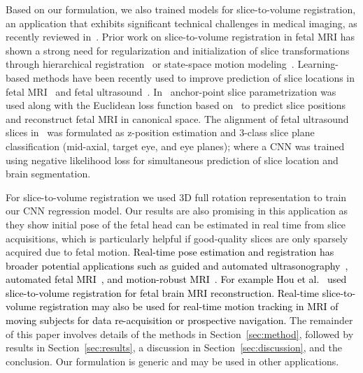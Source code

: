 \documentclass[journal,transmag]{IEEEtran}
\begin{document}
Based on our formulation, we also trained models for slice-to-volume registration, an application that exhibits significant technical challenges in medical imaging, as recently reviewed in~\cite{ferrante2017slice}. Prior work on slice-to-volume registration in fetal MRI has shown a strong need for regularization and initialization of slice transformations through hierarchical registration~\cite{gholipour2010robust,kainz2015fast} or state-space motion modeling~\cite{marami2017temporal}. Learning-based methods have been recently used to improve prediction of slice locations in fetal MRI~\cite{hou2017predicting,hou20183d} and fetal ultrasound~\cite{namburete2018fully}. In~\cite{hou2017predicting,hou20183d} anchor-point slice parametrization was used along with the Euclidean loss function based on~\cite{kendall2015posenet} to predict slice positions and reconstruct fetal MRI in canonical space. The alignment of fetal ultrasound slices in~\cite{namburete2018fully} was formulated as z-position estimation and 3-class slice plane classification (mid-axial, target eye, and eye planes); where a CNN was trained using negative likelihood loss for simultaneous prediction of slice location and brain segmentation.

For slice-to-volume registration we used 3D full rotation representation to train our CNN regression model. Our results are also promising in this application as they show initial pose of the fetal head can be estimated in real time from slice acquisitions, which is particularly helpful if good-quality slices are only sparsely acquired due to fetal motion. \textcolor{black}{Real-time pose estimation and registration has broader potential applications such as guided and automated ultrasonography~\cite{namburete2018fully}, automated fetal MRI~\cite{hou2017predicting,gholipour2014fetal}, and motion-robust MRI~\cite{thesen2000prospective,white2010promo,gholipour2011motion,marami2016motion,kurugol2017motion}.} \textcolor{black}{For example Hou et al.~\cite{hou20183d} used slice-to-volume registration for fetal brain MRI reconstruction. Real-time slice-to-volume registration may also be used for real-time motion tracking in MRI of moving subjects for data re-acquisition or prospective navigation.} The remainder of this paper involves details of the methods in Section~\ref{sec:method}, followed by results in Section~\ref{sec:results}, a discussion in Section~\ref{sec:discussion}, and the conclusion. Our formulation is generic and may be used in other applications.

\end{document}

